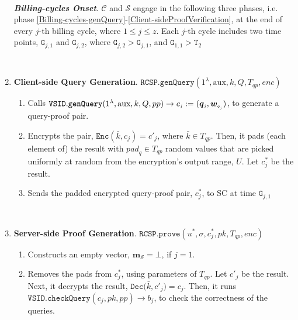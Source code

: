 \begin{enumerate}
\

\textbf{\textit{Billing-cycles Onset}}. $\mathcal{C}$ and $\mathcal{S}$ engage in the following three phases, i.e. phase \ref{Billing-cycles-genQuery}-\ref{Client-sideProofVerification},  at the end of every $j$-th billing cycle, where $1\leq j\leq z$. Each $j$-th cycle includes two  time points, $\texttt{G}_{\scriptscriptstyle j,1}$ and $\texttt{G}_{\scriptscriptstyle j,2}$, where $\texttt{G}_{\scriptscriptstyle j,2}>\texttt{G}_{\scriptscriptstyle j,1}$, and $\texttt{G}_{\scriptscriptstyle 1,1}>\texttt{T}_{\scriptscriptstyle 2}$ 



\

\item\textbf{Client-side Query Generation}.\label{Billing-cycles-genQuery} $\mathtt{RCSP}.\mathtt{genQuery}(1^\lambda, \text{aux},k,Q, T_{\scriptscriptstyle qp}, enc)$

\begin{enumerate}
\item Calls $\mathtt{VSID.genQuery}(1^{\lambda},  \text{aux},k,Q, {pp})\rightarrow c_{\scriptscriptstyle j}:=(\bm{q}_{\scriptscriptstyle j},\bm{w}_{\scriptscriptstyle q_{_{\scaleto{j}{\size}}}})$, to generate a query-proof pair. 
\item Encrypts the pair, $\mathtt{Enc}(\bar{k},c_{\scriptscriptstyle j})=c'_{\scriptscriptstyle j}$, where $\bar{k}\in T_{\scriptscriptstyle qp}$. Then, it pads (each element of) the result with ${pad}_{\scriptscriptstyle q}\in T_{\scriptscriptstyle qp}$ random values that are picked uniformly at random from the encryption's output range, $U$. Let $c^{\scriptscriptstyle *}_{\scriptscriptstyle j}$ be the result. 
\item Sends the padded encrypted query-proof pair, $c^{\scriptscriptstyle *}_{\scriptscriptstyle j}$, to SC at time $\texttt{G}_{\scriptscriptstyle j,1}$
\end{enumerate}

\

\item\textbf{Server-side Proof Generation}. $\mathtt{RCSP}.\mathtt{prove}(u^{\scriptscriptstyle *},  \sigma,  c^{\scriptscriptstyle *}_{\scriptscriptstyle j}, pk, T_{\scriptscriptstyle qp}, enc)$


\begin{enumerate}

\item Constructs an empty  vector, $\bm{m}_{\scriptscriptstyle\mathcal S}=\bot$, if $j=1$.  
\item Removes the pads from $c^{\scriptscriptstyle *}_{\scriptscriptstyle j}$, using  parameters of $T_{\scriptscriptstyle qp}$. Let  $c'_{\scriptscriptstyle j}$ be the result. Next, it  decrypts  the result, $\mathtt{Dec(}\bar{k},c'_{\scriptscriptstyle j})=c_{\scriptscriptstyle j}$. Then,  it   runs $\mathtt{VSID.checkQuery}(c_{\scriptscriptstyle j}, pk, {pp})\rightarrow b_{\scriptscriptstyle j}$, to check the correctness of the queries.




\end{enumerate}
\end{enumerate}
